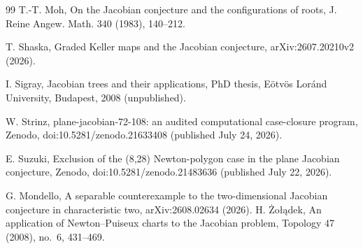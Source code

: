\documentclass[11pt]{article}
\theoremstyle{definition}
\theoremstyle{remark}
\begin{document}
\begin{thebibliography}{99}
 T.-T. Moh, On the Jacobian conjecture and the configurations of roots, J. Reine Angew. Math. 340 (1983), 140--212.

 T. Shaska, Graded Keller maps and the Jacobian conjecture, arXiv:2607.20210v2 (2026).

 I. Sigray, Jacobian trees and their applications, PhD thesis, E\"otv\"os Lor\'and University, Budapest, 2008 (unpublished).

 W. Strinz, plane-jacobian-72-108: an audited computational case-closure program, Zenodo, doi:10.5281/zenodo.21633408 (published July 24, 2026).

 E. Suzuki, Exclusion of the (8,28) Newton-polygon case in the plane Jacobian conjecture, Zenodo, doi:10.5281/zenodo.21483636 (published July 22, 2026).

 G. Mondello, A separable counterexample to the two-dimensional Jacobian conjecture in characteristic two, arXiv:2608.02634 (2026).
 H. \.Zo{\l}\k{a}dek, An application of Newton--Puiseux charts to the Jacobian problem, Topology 47 (2008), no.\ 6, 431--469.

\end{thebibliography}
\end{document}
